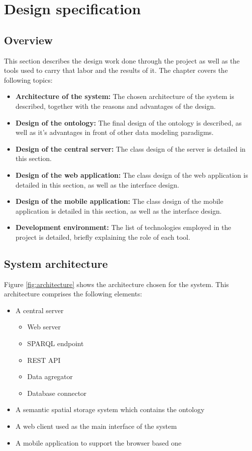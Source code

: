 \chapter{Design specification}\label{ch:design}

\section{Overview}

This section describes the design work done through the project as well as the tools used to carry that labor and the results of it. The chapter covers the following topics:

\begin{itemize}
\item \textbf{Architecture of the system:} The chosen architecture of the system is described, together with the reasons and advantages of the design.
\item \textbf{Design of the ontology:} The final design of the ontology is described, as well as it's advantages in front of other data modeling paradigms.
\item \textbf{Design of the central server:} The class design of the server is detailed in this section.
\item \textbf{Design of the web application:} The class design of the web application is detailed in this section, as well as the interface design.
\item \textbf{Design of the mobile application:} The class design of the mobile application is detailed in this section, as well as the interface design.
\item \textbf{Development environment:} The list of technologies employed in the project is detailed, briefly explaining the role of each tool.

\end{itemize}

\section{System architecture}\label{sec:designarch}

Figure \ref{fig:architecture} shows the architecture chosen for the system. This architecture comprises the following elements:

\begin{itemize}
\item A central server
  \begin{itemize}
  \item Web server
  \item SPARQL endpoint
  \item REST API
  \item Data agregator
  \item Database connector
  \end{itemize}
\item A semantic spatial storage system which contains the ontology
\item A web client used as the main interface of the system
\item A mobile application to support the browser based one
\end{itemize}

